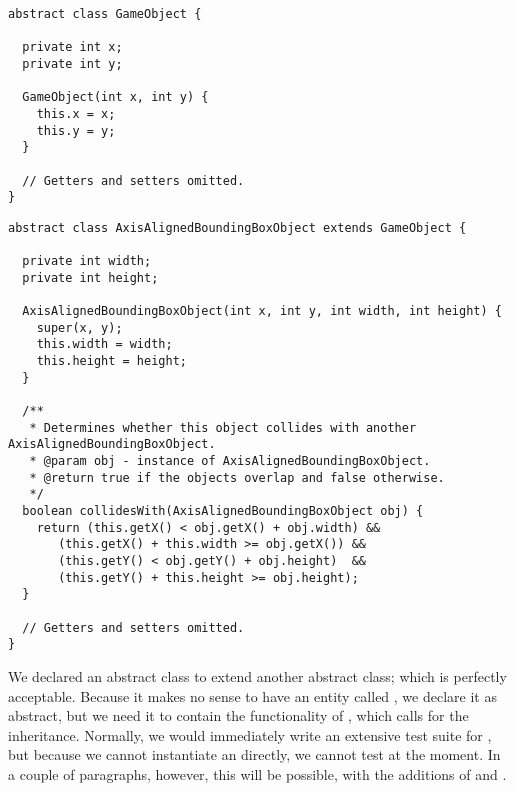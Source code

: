 \begin{lstlisting}[language=MyJava]
abstract class GameObject {
  
  private int x;
  private int y;

  GameObject(int x, int y) {
    this.x = x;
    this.y = y;
  }

  // Getters and setters omitted.
}
\end{lstlisting}

\begin{lstlisting}[language=Myjava]
abstract class AxisAlignedBoundingBoxObject extends GameObject {
  
  private int width;
  private int height;

  AxisAlignedBoundingBoxObject(int x, int y, int width, int height) {
    super(x, y);
    this.width = width;
    this.height = height;
  }

  /**
   * Determines whether this object collides with another AxisAlignedBoundingBoxObject.
   * @param obj - instance of AxisAlignedBoundingBoxObject.
   * @return true if the objects overlap and false otherwise.
   */
  boolean collidesWith(AxisAlignedBoundingBoxObject obj) {
    return (this.getX() < obj.getX() + obj.width) &&
	   (this.getX() + this.width >= obj.getX()) &&
 	   (this.getY() < obj.getY() + obj.height)  &&
	   (this.getY() + this.height >= obj.height); 
  }
  
  // Getters and setters omitted.
}
\end{lstlisting}

We declared an abstract class to extend another abstract class; which is perfectly acceptable. Because it makes no sense to have an entity called , we declare it as abstract, but we need it to contain the functionality of , which calls for the inheritance. Normally, we would immediately write an extensive test suite for , but because we cannot instantiate an  directly, we cannot test  at the moment. In a couple of paragraphs, however, this will be possible, with the additions of  and .

